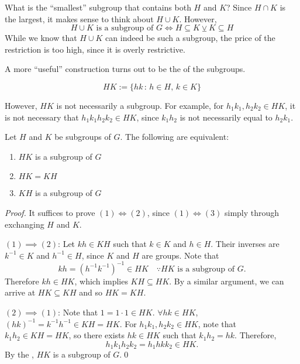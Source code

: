 What is the ``smallest'' subgroup that contains both $H$ and $K$? Since $H \cap K$ is the largest, it makes sense to think about $H \cup K$. However,
\begin{equation*}
  H \cup K \text{ is a subgroup of } G \iff H \subseteq K \veebar K \subseteq H
\end{equation*}
While we know that $H \cup K$ can indeed be such a subgroup, the price of the restriction is too high, since it is overly restrictive.

A more ``useful'' construction turns out to be the  of the subgroups.

\begin{defn}
\label{defn:product_of_groups}
  \begin{equation*}
    HK := \{ hk \, : \, h \in H, \, k \in K \}
  \end{equation*}
\end{defn}

However, $HK$ is not necessarily a subgroup. For example, for $h_1 k_1, h_2 k_2 \in HK$, it is not necessary that $h_1 k_1 h_2 k_2 \in HK$, since $k_1 h_2$ is not necessarily equal to $h_2 k_1$.

\begin{lemma}
\label{lemma:product_of_groups_as_a_subgroup}
  Let $H$ and $K$ be subgroups of $G$. The following are equivalent:
  \begin{enumerate}
    \item $HK$ is a subgroup of $G$
    \item $HK = KH$ 
    \item $KH$ is a subgroup of $G$
  \end{enumerate}
\end{lemma}

\begin{proof}
  It suffices to prove $(1) \iff (2)$, since $(1) \iff (3)$ simply through exchanging $H$ and $K$.

  \noindent $(1) \implies (2)$: Let $kh \in KH$ such that $k \in K$ and $h \in H$. Their inverses are $k^{-1} \in K$ and $h^{-1} \in H$, since $K$ and $H$ are groups. Note that
  \begin{equation*}
    kh = (h^{-1} k^{-1})^{-1} \in HK \quad \because HK \text{ is a subgroup of } G.
  \end{equation*}
  Therefore $kh \in HK$, which implies $KH \subseteq HK$. By a similar argument, we can arrive at $HK \subseteq KH$ and so $HK = KH$.

  \noindent $(2) \implies (1)$: Note that $1 = 1 \cdot 1 \in HK$. $\forall hk \in HK$, $(hk)^{-1} = k^{-1} h^{-1} \in KH = HK$. For $h_1 k_1, h_2 k_2 \in HK$, note that $k_1 h_2 \in KH = HK$, so there exists $h k \in HK$ such that $k_1 h_2 = hk$. Therefore,
  \begin{equation*}
    h_1 k_1 h_2 k_2 = h_1 h k k_2 \in HK.
  \end{equation*}
  By the , $HK$ is a subgroup of $G$.\qed
\end{proof}

